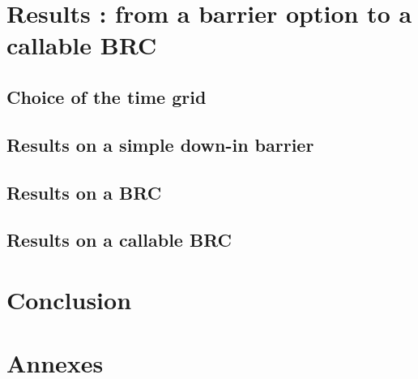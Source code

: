 \documentclass[a4paper,11pt,english]{book}
\let\cleardoublepage\clearpage
\begin{document}

\chapter{Results : from a barrier option to a callable BRC}

\section{Choice of the time grid}
\section{Results on a simple down-in barrier}
\section{Results on a BRC}
\section{Results on a callable BRC}

\backmatter
\chapter*{Conclusion}


\newpage
\nocite{*}






\newpage
\begingroup
\let\clearpage\relax
\let\cleardoublepage\relax


\renewcommand{\thesection}{\Alph{section}}
\chapter*{Annexes}
\appendix
{}


\endgroup
\end{document}

